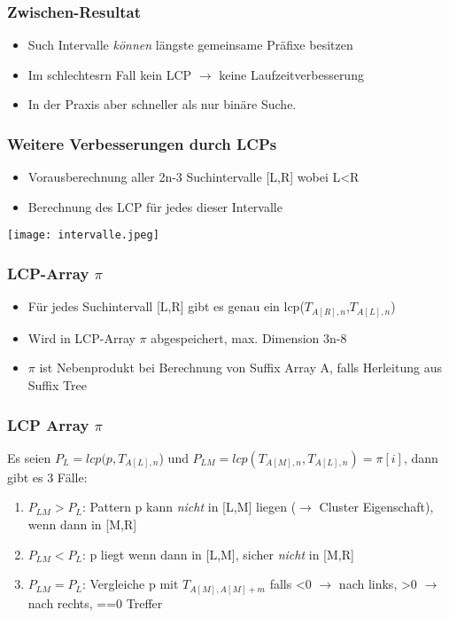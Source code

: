 \documentclass{beamer}
\begin{document}
\begin{frame}
\frametitle{Zwischen-Resultat}
\begin{itemize}
\item Such Intervalle \textit{können} längste gemeinsame Präfixe besitzen
\item Im schlechtesrn Fall kein LCP $\rightarrow$ keine Laufzeitverbesserung
\item In der Praxis aber schneller als nur binäre Suche.
\end{itemize}
\end{frame}
\begin{frame}
\frametitle{Weitere Verbesserungen durch LCPs}
\begin{itemize}
\item Vorausberechnung aller 2n-3 Suchintervalle [L,R] wobei L<R
\item Berechnung des LCP für jedes dieser Intervalle
\end{itemize}
\texttt{[image: intervalle.jpeg]}
\end{frame}

\begin{frame}
\frametitle{LCP-Array $\pi$}
\begin{itemize}
\item Für jedes Suchintervall [L,R] gibt es genau ein lcp($T_{A[R],n}$,$T_{A[L],n}$)
\item Wird in LCP-Array $\pi$ abgespeichert, max. Dimension 3n-8
\item $\pi$ ist Nebenprodukt bei Berechnung von Suffix Array A, falls Herleitung aus Suffix Tree
\end{itemize}
\end{frame}

\begin{frame}
\frametitle{LCP Array $\pi$}
Es seien $P_L = lcp(p,T_{A[L],n}$) und $P_{LM} = lcp(T_{A[M],n},T_{A[L],n}) = \pi[i]$, dann gibt es 3 Fälle:\newline
\begin{enumerate}
\item $P_{LM} > P_L$: Pattern p kann \textit{nicht} in [L,M] liegen ($\rightarrow$ Cluster Eigenschaft), wenn dann in [M,R]
\item $P_{LM} < P_L$: p liegt wenn dann in [L,M], sicher \textit{nicht} in [M,R]
\item $P_{LM} = P_L$: Vergleiche p mit $T_{A[M],A[M]+m}$ falls <0 $\rightarrow$ nach links, >0 $\rightarrow$ nach rechts, ==0 Treffer
\end{enumerate}
\end{frame}
\end{document}
